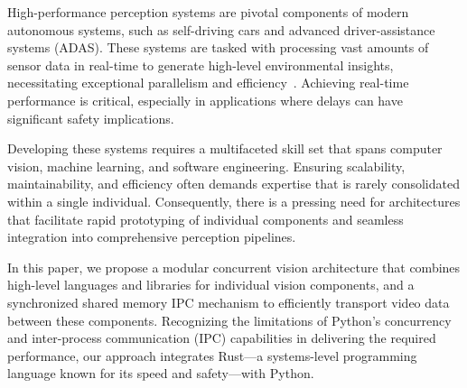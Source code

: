 \documentclass[conference]{IEEEtran}
\begin{document}
%
%

High-performance perception systems are pivotal components of modern autonomous systems, such as self-driving cars and advanced driver-assistance systems (ADAS). These systems are tasked with processing vast amounts of sensor data in real-time to generate high-level environmental insights, necessitating exceptional parallelism and efficiency~\cite{rosique2019systematic}.
Achieving real-time performance is critical, especially in applications where delays can have significant safety implications.

Developing these systems requires a multifaceted skill set that spans computer vision, machine learning, and software engineering.
Ensuring scalability, maintainability, and efficiency often demands expertise that is rarely consolidated within a single individual.
Consequently, there is a pressing need for architectures that facilitate rapid prototyping of individual components and seamless integration into comprehensive perception pipelines.

In this paper, we propose a modular concurrent vision architecture that combines high-level languages and libraries for individual vision components, and a synchronized shared memory IPC mechanism to efficiently transport video data between these components.
Recognizing the limitations of Python's concurrency and inter-process communication (IPC) capabilities in delivering the required performance, our approach integrates Rust—a systems-level programming language known for its speed and safety—with Python.
\end{document}
